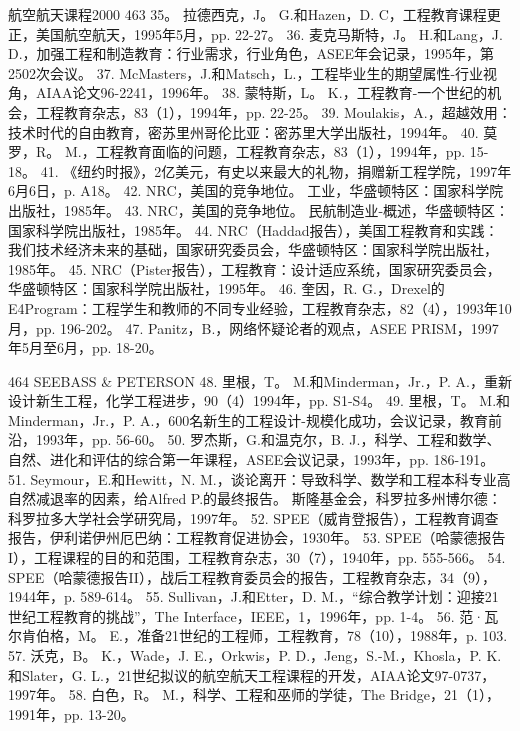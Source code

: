 \documentclass[UTF8,11pt,a4paper,openany,fontset=fandol]{ctexbook}
\begin{document}
航空航天课程2000 463 35。 拉德西克，J。 G.和Hazen，D. C，工程教育课程更正，美国航空航天，1995年5月，pp. 22-27。 36. 麦克马斯特，J。 H.和Lang，J. D.，加强工程和制造教育：行业需求，行业角色，ASEE年会记录，1995年，第2502次会议。 37. McMasters，J.和Matsch，L.，工程毕业生的期望属性-行业视角，AIAA论文96-2241，1996年。 38. 蒙特斯，L。 K.，工程教育-一个世纪的机会，工程教育杂志，83（1），1994年，pp. 22-25。 39. Moulakis，A.，超越效用：技术时代的自由教育，密苏里州哥伦比亚：密苏里大学出版社，1994年。 40. 莫罗，R。 M.，工程教育面临的问题，工程教育杂志，83（1），1994年，pp. 15-18。 41. 《纽约时报》，2亿美元，有史以来最大的礼物，捐赠新工程学院，1997年6月6日，p. A18。 42. NRC，美国的竞争地位。 工业，华盛顿特区：国家科学院出版社，1985年。 43. NRC，美国的竞争地位。 民航制造业-概述，华盛顿特区：国家科学院出版社，1985年。 44. NRC（Haddad报告），美国工程教育和实践：我们技术经济未来的基础，国家研究委员会，华盛顿特区：国家科学院出版社，1985年。 45. NRC（Pister报告），工程教育：设计适应系统，国家研究委员会，华盛顿特区：国家科学院出版社，1995年。 46. 奎因，R. G.，Drexel的E4Program：工程学生和教师的不同专业经验，工程教育杂志，82（4），1993年10月，pp. 196-202。 47. Panitz，B.，网络怀疑论者的观点，ASEE PRISM，1997年5月至6月，pp. 18-20。

464 SEEBASS \& PETERSON 48. 里根，T。 M.和Minderman，Jr.，P. A.，重新设计新生工程，化学工程进步，90（4）1994年，pp. S1-S4。 49. 里根，T。 M.和Minderman，Jr.，P. A.，600名新生的工程设计-规模化成功，会议记录，教育前沿，1993年，pp. 56-60。 50. 罗杰斯，G.和温克尔，B. J.，科学、工程和数学、自然、进化和评估的综合第一年课程，ASEE会议记录，1993年，pp. 186-191。 51. Seymour，E.和Hewitt，N. M.，谈论离开：导致科学、数学和工程本科专业高自然减退率的因素，给Alfred P.的最终报告。 斯隆基金会，科罗拉多州博尔德：科罗拉多大学社会学研究局，1997年。 52. SPEE（威肯登报告），工程教育调查报告，伊利诺伊州厄巴纳：工程教育促进协会，1930年。 53. SPEE（哈蒙德报告I），工程课程的目的和范围，工程教育杂志，30（7），1940年，pp. 555-566。 54. SPEE（哈蒙德报告II），战后工程教育委员会的报告，工程教育杂志，34（9），1944年，p. 589-614。 55. Sullivan，J.和Etter，D. M.，“综合教学计划：迎接21世纪工程教育的挑战”，The Interface，IEEE，1，1996年，pp. 1-4。 56. 范·瓦尔肯伯格，M。 E.，准备21世纪的工程师，工程教育，78（10），1988年，p. 103. 57. 沃克，B。 K.，Wade，J. E.，Orkwis，P. D.，Jeng，S.-M.，Khosla，P. K.和Slater，G. L.，21世纪拟议的航空航天工程课程的开发，AIAA论文97-0737，1997年。 58. 白色，R。 M.，科学、工程和巫师的学徒，The Bridge，21（1），1991年，pp. 13-20。

\clearpage
\end{document}
